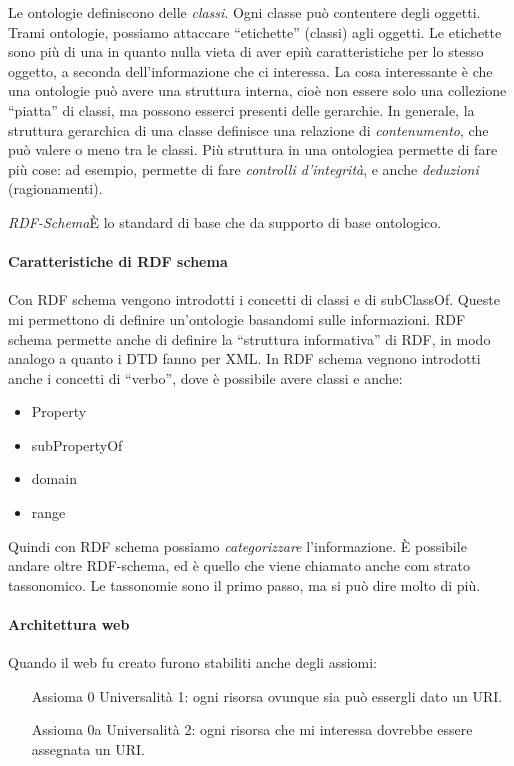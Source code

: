 Le ontologie definiscono delle \textit{classi}. Ogni classe pu\`o contentere degli oggetti. Trami ontologie, possiamo attaccare ``etichette'' (classi) agli oggetti. Le etichette sono pi\`u di una in quanto nulla vieta di aver epi\`u caratteristiche per lo stesso oggetto, a seconda dell'informazione che ci interessa. La cosa interessante \`e che una ontologie pu\`o avere una struttura interna, cio\`e non essere solo una collezione ``piatta'' di classi, ma possono esserci presenti delle gerarchie. In generale, la struttura gerarchica di una classe definisce una relazione di \textit{contenumento}, che pu\`o valere o meno tra le classi. Pi\`u struttura in una ontologiea permette di fare pi\`u cose: ad esempio, permette di fare \textit{controlli d'integrit\`a}, e anche \textit{deduzioni} (ragionamenti).

\textit{RDF-Schema}\`E lo standard di base che da supporto di base ontologico.

\paragraph*{Caratteristiche di RDF schema}Con RDF schema vengono introdotti i concetti di classi e di subClassOf. Queste mi permettono di definire un'ontologie basandomi sulle informazioni. RDF schema permette anche di definire la ``struttura informativa'' di RDF, in modo analogo a quanto i DTD fanno per XML. In RDF schema vegnono introdotti anche i concetti di ``verbo'', dove \`e possibile avere classi e anche:
\begin{itemize}

\item Property %
\item subPropertyOf
\item domain
\item range

\end{itemize}

Quindi con RDF schema possiamo \textit{categorizzare} l'informazione. \`E possibile andare oltre RDF-schema, ed \`e quello che viene chiamato anche com strato tassonomico. Le tassonomie sono il primo passo, ma si pu\`o dire molto di pi\`u.

\paragraph*{Architettura web}Quando il web fu creato furono stabiliti anche degli assiomi:
\begin{itemize}

\item[Assioma 0] Universalit\`a 1: ogni risorsa ovunque sia pu\`o essergli dato un URI.
\item[Assioma 0a] Universalit\`a 2: ogni risorsa che mi interessa dovrebbe essere assegnata un URI.
  

\end{itemize}

